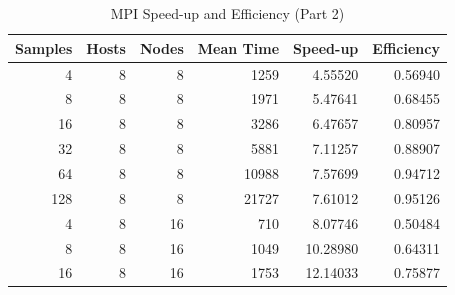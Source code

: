 \documentclass[journal,transmag]{IEEEtran}
\begin{document}
\section{}
	\begin{table}[h]
	\centering
	\caption{MPI Speed-up and Efficiency (Part 2)}
	\label{table_mpi_data_2}
	\begin{tabular}{|r|r|r|r|r|r|}
		\hline
		\multicolumn{1}{|l|}{Samples} & \multicolumn{1}{l|}{Hosts} & \multicolumn{1}{l|}{Nodes} & \multicolumn{1}{l|}{Mean Time} & \multicolumn{1}{l|}{Speed-up} & \multicolumn{1}{l|}{Efficiency} \\ \hline
		4                             & 8                          & 8                                & 1259                           & 4.55520                       & 0.56940                         \\ \hline
		8                             & 8                          & 8                                & 1971                           & 5.47641                       & 0.68455                         \\ \hline
		16                            & 8                          & 8                                & 3286                           & 6.47657                       & 0.80957                         \\ \hline
		32                            & 8                          & 8                                & 5881                           & 7.11257                       & 0.88907                         \\ \hline
		64                            & 8                          & 8                                & 10988                          & 7.57699                       & 0.94712                         \\ \hline
		128                           & 8                          & 8                                & 21727                          & 7.61012                       & 0.95126                         \\ \hline
		4                             & 8                          & 16                               & 710                            & 8.07746                       & 0.50484                         \\ \hline
		8                             & 8                          & 16                               & 1049                           & 10.28980                      & 0.64311                         \\ \hline
		16                            & 8                          & 16                               & 1753                           & 12.14033                      & 0.75877                         \\ \hline

\end{tabular}
\end{table}
\end{document}
